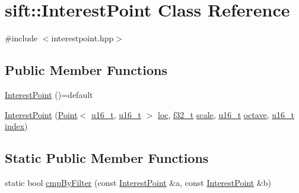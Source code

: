 \hypertarget{classsift_1_1InterestPoint}{}\section{sift\+:\+:Interest\+Point Class Reference}
\label{classsift_1_1InterestPoint}


{\ttfamily \#include $<$interestpoint.\+hpp$>$}

\subsection*{Public Member Functions}
\begin{DoxyCompactItemize}
\item 
\hyperlink{classsift_1_1InterestPoint_a8ef2ad74ae5d90f5b02c901523937db1}{Interest\+Point} ()=default
\item 
\hyperlink{classsift_1_1InterestPoint_a2845bc92e9896460fa76fbb5e61de457}{Interest\+Point} (\hyperlink{classsift_1_1Point}{Point}$<$ \hyperlink{types_8hpp_a4f53bd979bf45b1ce27e5f43e3a0d33b}{u16\+\_\+t}, \hyperlink{types_8hpp_a4f53bd979bf45b1ce27e5f43e3a0d33b}{u16\+\_\+t} $>$ \hyperlink{classsift_1_1InterestPoint_a843e9ca44ce7ddefead792ca4c787f20}{loc}, \hyperlink{types_8hpp_a37279f6a792de218cef11dff445d532a}{f32\+\_\+t} \hyperlink{classsift_1_1InterestPoint_abcdd744160459cfbd2330b5d6b8a2926}{scale}, \hyperlink{types_8hpp_a4f53bd979bf45b1ce27e5f43e3a0d33b}{u16\+\_\+t} \hyperlink{classsift_1_1InterestPoint_a2daaf1185f5658cabc2e8a3768b7f321}{octave}, \hyperlink{types_8hpp_a4f53bd979bf45b1ce27e5f43e3a0d33b}{u16\+\_\+t} \hyperlink{classsift_1_1InterestPoint_a9ec87bddea9e66a5e7e655ddf6483799}{index})
\end{DoxyCompactItemize}
\subsection*{Static Public Member Functions}
\begin{DoxyCompactItemize}
\item 
static bool \hyperlink{classsift_1_1InterestPoint_a658ee07aa492bafbc30855319133559a}{cmp\+By\+Filter} (const \hyperlink{classsift_1_1InterestPoint}{Interest\+Point} \&a, const \hyperlink{classsift_1_1InterestPoint}{Interest\+Point} \&b)
\end{DoxyCompactItemize}
